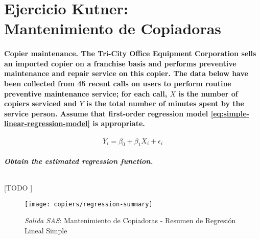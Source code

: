 \documentclass{article}
\begin{document}
  \maketitle


  \part{Ejercicio Kutner:\\ Mantenimiento de Copiadoras}



    \setcounter{section}{1}
    \setcounter{subsection}{19}
    \subsection{\textbf{Copier maintenance}. The Tri-City Office Equipment Corporation sells an imported copier on a franchise basis and performs preventive maintenance and repair service on this copier. The data below have been collected from 45 recent calls on users to perform routine preventive maintenance service; for each call, $X$ is the number of copiers serviced and $Y$ is the total number of minutes spent by the service person. Assume that first-order regression model \eqref{eq:simple-linear-regression-model} is appropriate.}
    \label{sec:e1-20}

      \begin{equation}
      \label{eq:simple-linear-regression-model}
        Y_i = \beta_0 + \beta_1X_i + \epsilon_i
      \end{equation}

      \subsubsection{Obtain the estimated regression function.}

        \paragraph{}
        [TODO ]

        \begin{figure}[!h]
          \centering
          \texttt{[image: copiers/regression-summary]}
          \caption{\emph{Salida SAS}: Mantenimiento de Copiadoras - Resumen de Regresión Lineal Simple}
          \label{img:copiers-regression-summary}
        \end{figure}
\end{document}
